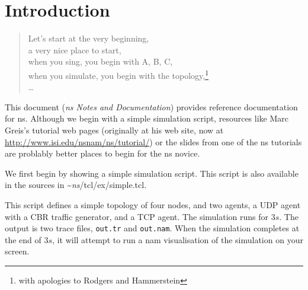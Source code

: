 
\chapter{Introduction}

\begin{quote}
Let's start at the very beginning, \\
a very nice place to start, \\
when you sing, you begin with A, B, C, \\
when you simulate, you begin with the topology,\footnote{%
with apologies to Rodgers and Hammerstein}\\
\ldots
\end{quote}

This document (\emph{ns Notes and Documentation}) provides reference
  documentation for ns.
Although we begin with a simple simulation script,
  resources like Marc Greis's tutorial web pages
  (originally at his web site,
  now at \url{http://www.isi.edu/nsnam/ns/tutorial/})
  or the slides from one of the ns tutorials
  are problably better places to begin for the ns novice.

We first begin by showing a simple simulation script.
This script is also available in the sources in
\textasciitilde\emph{ns}/{tcl/ex/simple.tcl}.

This script defines a simple topology of four nodes,
and two agents, a UDP agent with a CBR traffic generator, and a TCP agent.
The simulation runs for $3s$.  The output is two trace files,
{\tt out.tr} and {\tt out.nam}.
When the simulation completes at the end of $3s$,
it will attempt to run a nam visualisation of the simulation on your
screen.

